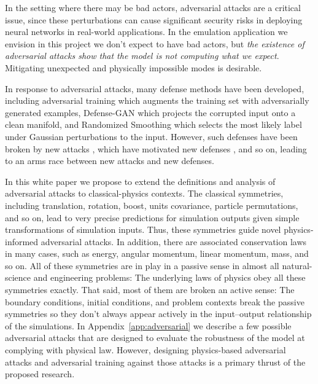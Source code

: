 \documentclass[10pt]{article}
\begin{document}
In the setting where there may be bad actors, adversarial attacks are a critical issue, since these perturbations can cause significant security risks in deploying neural networks in real-world applications. In the emulation application we envision in this project we don't expect to have bad actors, but \textit{the existence of adversarial attacks show that the model is not computing what we expect}.
Mitigating unexpected and physically impossible modes is desirable.  

In response to adversarial attacks, many defense methods have been developed, including adversarial training \cite{kurakin2016adversarial} which augments the training set with adversarially generated examples, Defense-GAN \cite{samangouei2018defense} which projects the corrupted input onto a clean manifold, and Randomized Smoothing \cite{cohen2019certified} which selects the most likely label under Gaussian perturbations to the input.
However, such defenses have been broken by new attacks \cite{athalye2018synthesizing,athalye2018obfuscated, carlini2017adversarial, uesato2018adversarial, athalye2018robustness}, which have motivated new defenses \cite{madry2017towards, samangouei2018defense, zhang2019theoretically, papernot2016distillation, kurakin2016adversarial, miyato2018virtual, zheng2016improving}, and so on, leading to an arms race between new attacks and new defenses. %

In this white paper we propose to extend the definitions and analysis of adversarial attacks to classical-physics contexts. The classical symmetries, including translation, rotation, boost, units covariance, particle permutations, and so on, lead to very precise predictions for simulation outputs given simple transformations of simulation inputs.
Thus, these symmetries guide novel physics-informed adversarial attacks.
In addition, there are associated conservation laws in many cases, such as energy, angular momentum, linear momentum, mass, and so on.
All of these symmetries are in play in a passive sense in almost all natural-science and engineering problems: The underlying laws of physics obey all these symmetries exactly.
That said, most of them are broken an active sense: The boundary conditions, initial conditions, and problem contexts break the passive symmetries so they don't always appear actively in the input--output relationship of the simulations.
In Appendix~\ref{app:adversarial} we describe a few possible adversarial attacks that are designed to evaluate the robustness of the model at complying with physical law. However, designing physics-based adversarial attacks and adversarial training against those attacks is a primary thrust of the proposed research. 
\end{document}
